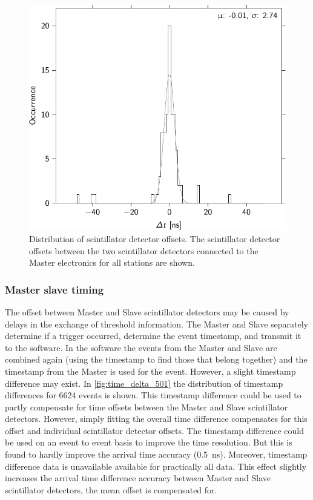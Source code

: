 \begin{figure}
    \centering
    \includegraphics{plots/station/detector_offset_distribution}
    \caption{Distribution of scintillator detector offsets. The scintillator detector offsets between the two scintillator detectors connected to the Master electronics for all \hisparc stations are shown.}
    \label{fig:detector_offset_distribution}
\end{figure}


\subsubsection{Master slave timing}
\label{sec:masterslavetiming}

The offset between Master and Slave scintillator detectors may be caused by delays in the exchange of threshold information. The Master and Slave separately determine if a trigger occurred, determine the event timestamp, and  transmit it to the \daq software. In the \daq software the events from the Master and Slave are combined again (using the timestamp to find those that belong together) and the timestamp from the Master is used for the event. However, a slight timestamp difference may exist. In \cref{fig:time_delta_501} the distribution of timestamp differences for \num{6624} events is shown. This timestamp difference could be used to partly compensate for time offsets between the Master and Slave scintillator detectors. However, simply fitting the overall time difference compensates for this offset and individual scintillator detector offsets. The timestamp difference could be used on an event to event basis to improve the time resolution. But this is found to hardly improve the arrival time accuracy (\SI{0.5}{\ns}). Moreover, timestamp difference data is unavailable available for practically all \hisparc data. This effect slightly increases the arrival time difference accuracy between Master and Slave scintillator detectors, the mean offset is compensated for.

